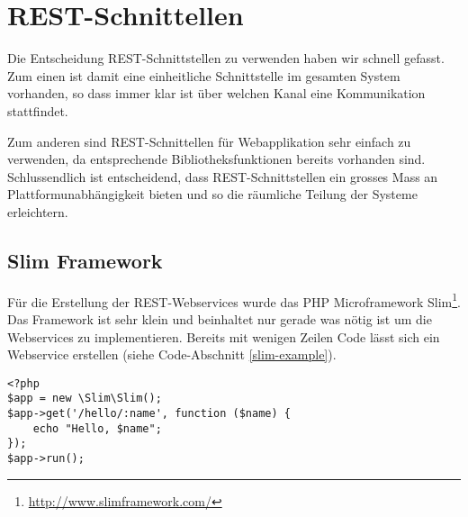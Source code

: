 \section{REST-Schnittellen}
Die Entscheidung \gls{REST}-Schnittstellen zu verwenden haben wir schnell gefasst. 
Zum einen ist damit eine einheitliche Schnittstelle im gesamten System vorhanden, so dass immer klar ist über welchen Kanal eine Kommunikation stattfindet.

Zum anderen sind \gls{REST}-Schnittellen für Webapplikation sehr einfach zu verwenden, da entsprechende Bibliotheksfunktionen bereits vorhanden sind.
Schlussendlich ist entscheidend, dass \gls{REST}-Schnittstellen ein grosses Mass an Plattformunabhängigkeit bieten und so die räumliche Teilung der Systeme erleichtern.

\subsection{Slim Framework}
Für die Erstellung der \gls{REST}-Webservices wurde das PHP Microframework Slim\footnote{\url{http://www.slimframework.com/}}.
Das Framework ist sehr klein und beinhaltet nur gerade was nötig ist um die Webservices zu implementieren.
Bereits mit wenigen Zeilen Code lässt sich ein Webservice erstellen (siehe Code-Abschnitt \ref{slim-example}).

\lstset{language=PHP}
\begin{lstlisting}[caption=Beispiel REST-Webservice in Slim, label=slim-example]
<?php
$app = new \Slim\Slim();
$app->get('/hello/:name', function ($name) {
    echo "Hello, $name";
});
$app->run();
\end{lstlisting}













